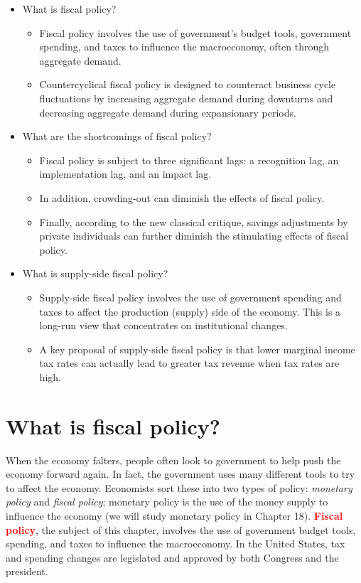 \documentclass[11pt]{article} %
\begin{document}
\begin{tcolorbox}[width=\textwidth,colback={white},title={Big Questions},colbacktitle=yellow,coltitle=blue]
\begin{itemize}
\item What is fiscal policy?
\begin{itemize}
\item Fiscal policy involves the use of government's budget tools, government spending, and taxes to influence the macroeconomy, often through aggregate demand.
\item Countercyclical fiscal policy is designed to counteract business cycle fluctuations by increasing aggregate demand during downturns and decreasing aggregate demand during expansionary periods.
\end{itemize}
\item What are the shortcomings of fiscal policy?
\begin{itemize}
\item Fiscal policy is subject to three significant lags: a recognition lag, an implementation lag, and an impact lag.
\item In addition, crowding-out can diminish the effects of fiscal policy.
\item Finally, according to the new classical critique, savings adjustments by private individuals can further diminish the stimulating effects of fiscal policy.
\end{itemize}
\item What is supply-side fiscal policy?
\begin{itemize}
\item Supply-side fiscal policy involves the use of government spending and taxes to affect the production (supply) side of the economy. This is a long-run view that concentrates on institutional changes.
\item A key proposal of supply-side fiscal policy is that lower marginal income tax rates can actually lead to greater tax revenue when tax rates are high.
\end{itemize}
\end{itemize}
\end{tcolorbox}

\section*{\textbf{What is fiscal policy?}}
When the economy falters, people often look to government to help push the economy forward again. In fact, the government uses many different tools to try to affect the economy. Economists sort these into two types of policy: \textit{monetary policy} and \textit{fiscal policy}; monetary policy is the use of the money supply to influence the economy (we will study monetary policy in Chapter 18). \textbf{\textcolor{red}{Fiscal policy}}, the subject of this chapter, involves the use of government budget tools, spending, and taxes to influence the macroeconomy. In the United States, tax and spending changes are legislated and approved by both Congress and the president.
\end{document}
